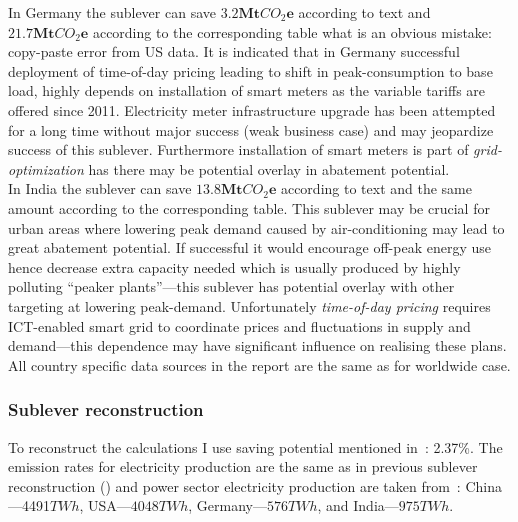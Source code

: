 \documentclass[11pt, twocolumn]{article}
\begin{document}
In Germany the sublever can save $\mathbf{3.2} \mathbf{Mt}CO_2\mathbf{e}$ according to text and $\mathbf{21.7} \mathbf{Mt}CO_2\mathbf{e}$ according to the corresponding table what is an obvious mistake: copy-paste error from US data. It is indicated that in Germany successful deployment of time-of-day pricing leading to shift in peak-consumption to base load, highly depends on installation of smart meters as the variable tariffs are offered since 2011. Electricity meter infrastructure upgrade has been attempted for a long time without major success (weak business case) and may jeopardize success of this sublever. Furthermore installation of smart meters is part of \emph{grid-optimization} has there may be potential overlay in abatement potential.\\

In India the sublever can save $\mathbf{13.8} \mathbf{Mt}CO_2\mathbf{e}$ according to text and the same amount according to the corresponding table. This sublever may be crucial for urban areas where lowering peak demand caused by air-conditioning may lead to great abatement potential. If successful it would encourage off-peak energy use hence decrease extra capacity needed which is usually produced by highly polluting ``peaker plants''---this sublever has potential overlay with other targeting at lowering peak-demand. Unfortunately \emph{time-of-day pricing} requires ICT-enabled smart grid to coordinate prices and fluctuations in supply and demand---this dependence may have significant influence on realising these plans.\\

All country specific data sources in the report are the same as for worldwide case.

\subsubsection{Sublever reconstruction\label{sec:todp:reconstruction}}
To reconstruct the calculations I use saving potential mentioned in~\citep{faruqui2005quantifying}: 2.37\%. The emission rates for electricity production are the same as in previous sublever reconstruction (\citep{iea2012co2}) and power sector electricity production are taken from~\citep{eia2011}: China---4491$TWh$, USA---$4048TWh$, Germany---$576TWh$, and India---$975TWh$.\\
\end{document}

